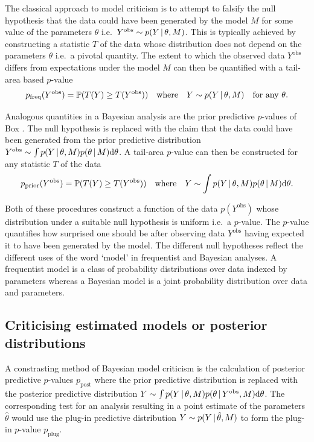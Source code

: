 \documentclass{article} %
\def\ie{i.e.\ }
\begin{document}
The classical approach to model criticism is to attempt to falsify the null hypothesis that the data could have been generated by the model $M$ for some value of the parameters $\theta$ \ie ${Y^\textrm{obs} \sim p(Y \,|\, \theta, M)}$.
This is typically achieved by constructing a statistic $T$ of the data whose distribution does not depend on the parameters $\theta$ \ie a pivotal quantity.
The extent to which the observed data $Y^\textrm{obs}$ differs from expectations under the model $M$ can then be quantified with a tail-area based $p$-value
\begin{equation}
  p_\textrm{freq}(Y^\textrm{obs}) = \mathbb{P}(T(Y)\geq T(Y^\textrm{obs})) \quad \textrm{where} \quad Y \sim p(Y \,|\, \theta, M) \quad \textrm{for any } \theta.
  \label{eq:freq-p-value}
\end{equation}

Analogous quantities in a Bayesian analysis are the prior predictive $p$-values of Box \citep{Box1980-ud}.
The null hypothesis is replaced with the claim that the data could have been generated from the prior predictive distribution ${Y^\textrm{obs} \sim \int p(Y \,|\, \theta, M)p(\theta \,|\, M) \mathrm{d}\theta}$.
A tail-area $p$-value can then be constructed for any statistic $T$ of the data
\begin{equation}
  p_\textrm{prior}(Y^\textrm{obs}) = \mathbb{P}(T(Y)\geq T(Y^\textrm{obs})) \quad \textrm{where} \quad Y \sim \int p(Y \,|\, \theta, M)p(\theta \,|\, M) \mathrm{d}\theta.
  \label{eq:prior-p-value}
\end{equation}

Both of these procedures construct a function of the data $p(Y^\textrm{obs})$ whose distribution under a suitable null hypothesis is uniform \ie a $p$-value.
The $p$-value quantifies how surprised one should be after observing data $Y^\textrm{obs}$ having expected it to have been generated by the model.
The different null hypotheses reflect the different uses of the word `model' in frequentist and Bayesian analyses.
A frequentist model is a class of probability distributions over data indexed by parameters whereas a Bayesian model is a joint probability distribution over data and parameters.

\subsection{Criticising estimated models or posterior distributions}

A constrasting method of Bayesian model criticism is the calculation of posterior predictive $p$-values \citep[e.g.][]{Rubin1984-tw} $p_\textrm{post}$ where the prior predictive distribution is replaced with the posterior predictive distribution ${Y \sim \int p(Y \,|\, \theta, M)p(\theta \,|\, Y^\textrm{obs}, M) \mathrm{d}\theta}$.
The corresponding test for an analysis resulting in a point estimate of the parameters $\hat\theta$ would use the plug-in predictive distribution ${Y \sim p(Y \,|\, \hat\theta, M)}$ to form the plug-in $p$-value $p_\textrm{plug}$.
\end{document}
